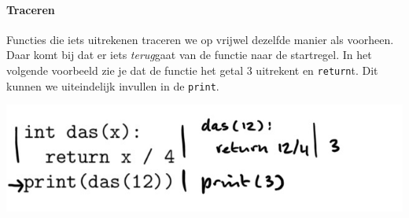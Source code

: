 %
%
%

%

\paragraph{Traceren}

Functies die iets uitrekenen traceren we op vrijwel dezelfde manier als voorheen. Daar komt bij dat er iets \emph{terug}gaat van de functie naar de startregel. In het volgende voorbeeld zie je dat de functie het getal 3 uitrekent en \texttt{return}t. Dit kunnen we uiteindelijk invullen in de \texttt{print}.

\includegraphics[width=.7\textwidth]{6-trace-returns.jpeg}
